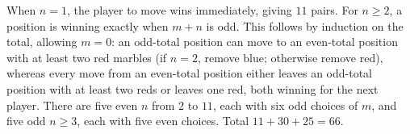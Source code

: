 When $n=1$, the player to move wins immediately, giving $11$ pairs. For $n\ge2$, a position is winning exactly when $m+n$ is odd. This follows by induction on the total, allowing $m=0$: an odd-total position can move to an even-total position with at least two red marbles (if $n=2$, remove blue; otherwise remove red), whereas every move from an even-total position either leaves an odd-total position with at least two reds or leaves one red, both winning for the next player. There are five even $n$ from $2$ to $11$, each with six odd choices of $m$, and five odd $n\ge3$, each with five even choices. Total $11+30+25=\boxed{66}$.
